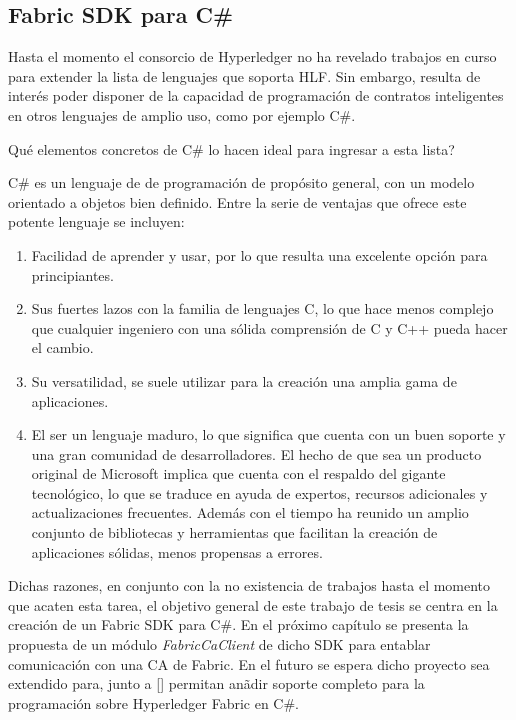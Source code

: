 \subsection{Fabric SDK para C\#}

Hasta el momento el consorcio de Hyperledger no ha revelado trabajos en curso para extender la lista de lenguajes que soporta HLF. Sin embargo, resulta de interés poder disponer de la capacidad de programación de contratos inteligentes en otros lenguajes de amplio uso, como por ejemplo C\#.

Qu\'e elementos concretos de C\# lo hacen ideal para ingresar a esta lista?

C\# es un lenguaje de de programación de propósito general, con un modelo orientado a objetos bien definido. Entre la serie de ventajas que ofrece este potente lenguaje se incluyen:

\begin{enumerate}
	\item Facilidad de aprender y usar, por lo que resulta una excelente opción para principiantes.
	\item Sus fuertes lazos con la familia de lenguajes C, lo que hace menos complejo que cualquier ingeniero con una sólida comprensión de C y C++ pueda hacer el cambio.
	
	\item Su versatilidad, se suele utilizar para la creaci\'on una amplia gama de aplicaciones.
	
	\item El ser un lenguaje maduro, lo que significa que cuenta con un buen soporte y una gran comunidad de desarrolladores. El hecho de que sea un producto original de Microsoft implica que cuenta con el respaldo del gigante tecnológico, lo que se traduce en ayuda de expertos, recursos adicionales y actualizaciones frecuentes. Adem\'as con el tiempo ha reunido un amplio conjunto de bibliotecas y herramientas que facilitan la creación de aplicaciones sólidas, menos propensas a errores.
\end{enumerate}

Dichas razones, en conjunto con la no existencia de trabajos hasta el momento que acaten esta tarea, el objetivo general de este trabajo de tesis se centra en la creaci\'on de un Fabric SDK para C\#. En el pr\'oximo cap\'itulo se presenta la propuesta de un m\'odulo \emph{FabricCaClient} de dicho SDK para entablar comunicaci\'on con una CA de Fabric. En el futuro se espera dicho proyecto sea extendido para, junto a [\cite{chaincode22csharp}] permitan an\~adir soporte completo para la programaci\'on sobre Hyperledger Fabric en C\#.
 